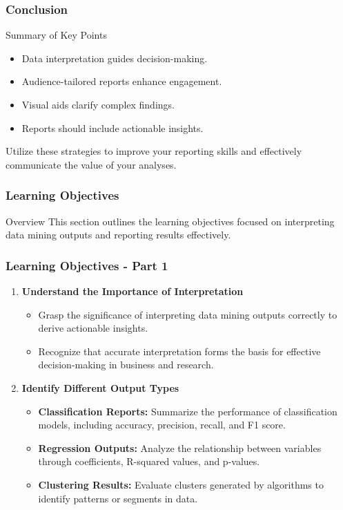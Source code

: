 \documentclass{beamer}
\begin{document}
\begin{frame}[fragile]
    \frametitle{Conclusion}
    \begin{block}{Summary of Key Points}
        \begin{itemize}
            \item Data interpretation guides decision-making.
            \item Audience-tailored reports enhance engagement.
            \item Visual aids clarify complex findings.
            \item Reports should include actionable insights.
        \end{itemize}
    \end{block}
    Utilize these strategies to improve your reporting skills and effectively communicate the value of your analyses.
\end{frame}

\begin{frame}[fragile]
    \frametitle{Learning Objectives}
    \begin{block}{Overview}
        This section outlines the learning objectives focused on interpreting data mining outputs and reporting results effectively.
    \end{block}
\end{frame}

\begin{frame}[fragile]
    \frametitle{Learning Objectives - Part 1}
    \begin{enumerate}
        \item \textbf{Understand the Importance of Interpretation}
        \begin{itemize}
            \item Grasp the significance of interpreting data mining outputs correctly to derive actionable insights.
            \item Recognize that accurate interpretation forms the basis for effective decision-making in business and research.
        \end{itemize}
        
        \item \textbf{Identify Different Output Types}
        \begin{itemize}
            \item \textbf{Classification Reports:} Summarize the performance of classification models, including accuracy, precision, recall, and F1 score.
            \item \textbf{Regression Outputs:} Analyze the relationship between variables through coefficients, R-squared values, and p-values.
            \item \textbf{Clustering Results:} Evaluate clusters generated by algorithms to identify patterns or segments in data.
        \end{itemize}
    \end{enumerate}
\end{frame}
\end{document}
